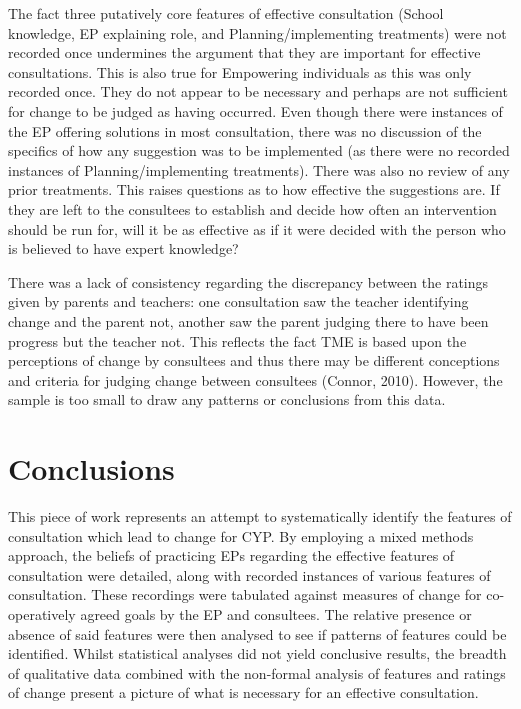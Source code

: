 \documentclass[
  english,
  man,floatsintext]{apa6}
\begin{document}
The fact three putatively core features of effective consultation
(School knowledge, EP explaining role, and Planning/implementing
treatments) were not recorded once undermines the argument that they are
important for effective consultations. This is also true for Empowering
individuals as this was only recorded once. They do not appear to be
necessary and perhaps are not sufficient for change to be judged as
having occurred. Even though there were instances of the EP offering
solutions in most consultation, there was no discussion of the specifics
of how any suggestion was to be implemented (as there were no recorded
instances of Planning/implementing treatments). There was also no review
of any prior treatments. This raises questions as to how effective the
suggestions are. If they are left to the consultees to establish and
decide how often an intervention should be run for, will it be as
effective as if it were decided with the person who is believed to have
expert knowledge?

There was a lack of consistency regarding the discrepancy between the
ratings given by parents and teachers: one consultation saw the teacher
identifying change and the parent not, another saw the parent judging
there to have been progress but the teacher not. This reflects the fact
TME is based upon the perceptions of change by consultees and thus there
may be different conceptions and criteria for judging change between
consultees (Connor, 2010). However, the sample
is too small to draw any patterns or conclusions from this data.

\hypertarget{conclusions}{%
\section{Conclusions}\label{conclusions}}

This piece of work represents an attempt to systematically identify the
features of consultation which lead to change for CYP. By employing a
mixed methods approach, the beliefs of practicing EPs regarding the
effective features of consultation were detailed, along with recorded
instances of various features of consultation. These recordings were
tabulated against measures of change for co-operatively agreed goals by
the EP and consultees. The relative presence or absence of said features
were then analysed to see if patterns of features could be identified.
Whilst statistical analyses did not yield conclusive results, the
breadth of qualitative data combined with the non-formal analysis of
features and ratings of change present a picture of what is necessary
for an effective consultation.
\end{document}
